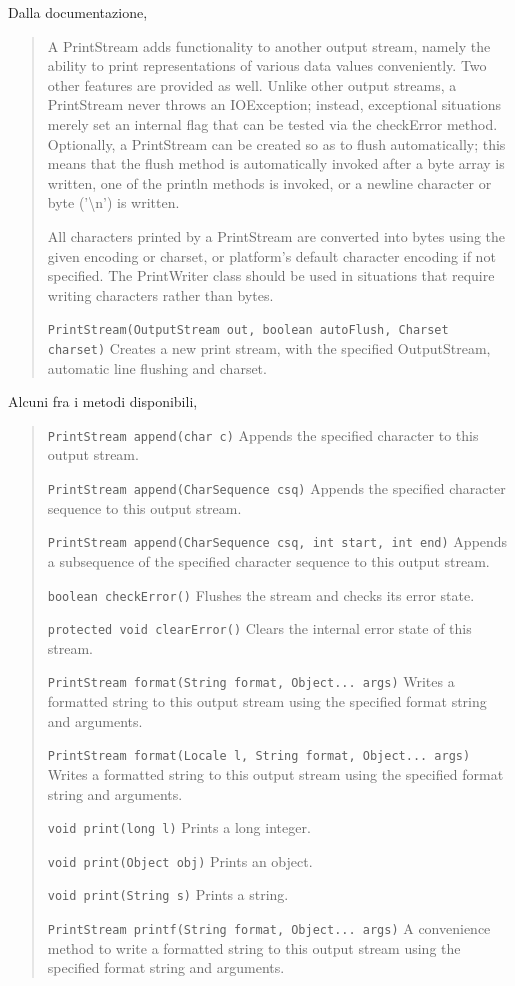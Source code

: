 \documentclass[\fontsizeclass,twocolumn]{\classname}
\theoremstyle{definition}
\theoremstyle{definition}
\begin{document}
Dalla documentazione,
\begin{quote}
    \footnotesize{A PrintStream adds functionality to another output stream,
        namely the ability to print representations of various data values
        conveniently. Two other features are provided as well. Unlike other
        output streams, a PrintStream never throws an IOException; instead,
        exceptional situations merely set an internal flag that can be tested
        via the checkError method. Optionally, a PrintStream can be created so
        as to flush automatically; this means that the flush method is
        automatically invoked after a byte array is written, one of the println
        methods is invoked, or a newline character or byte ('\textbackslash n')
        is written.

All characters printed by a PrintStream are converted into bytes using the
given encoding or charset, or platform's default character encoding if not
specified. The PrintWriter class should be used in situations that require
writing characters rather than bytes.


\texttt{PrintStream(OutputStream out, boolean autoFlush, Charset charset)} 	Creates a new print stream, with the specified OutputStream, automatic line flushing and charset.}
\end{quote}

Alcuni fra i metodi disponibili,

\begin{quote}
    \footnotesize{\texttt{PrintStream 	append(char c)} 	Appends the specified character to this output stream.

\texttt{PrintStream 	append(CharSequence csq)} 	Appends the specified character sequence to this output stream.

\texttt{PrintStream 	append(CharSequence csq, int start, int end)} 	Appends a subsequence of the specified character sequence to this output stream.

\texttt{boolean 	checkError()} 	Flushes the stream and checks its error state.

\texttt{protected void 	clearError()} 	Clears the internal error state of this stream.

\texttt{PrintStream 	format(String format, Object... args)} 	Writes a formatted string to this output stream using the specified format string and arguments.

\texttt{PrintStream 	format(Locale l, String format, Object... args)} 	Writes a formatted string to this output stream using the specified format string and arguments.

\texttt{void 	print(long l)} 	Prints a long integer.

\texttt{void 	print(Object obj)} 	Prints an object.

\texttt{void 	print(String s)} 	Prints a string.

\texttt{PrintStream 	printf(String format, Object... args)} 	A convenience
method to write a formatted string to this output stream using the specified
format string and arguments.}
\end{quote}
\end{document}
